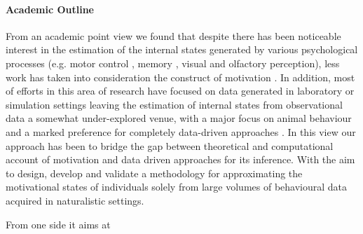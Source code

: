 \paragraph*{Academic Outline}
From an academic point view we found that despite there has been noticeable interest in the estimation of the internal states generated by various psychological processes (e.g. motor control \cite{gallego2017neural}, memory \cite{derdikman2011manifold, nieh2021geometry}, visual \cite{seung2000manifold, ganmor2015thesaurus} and olfactory \cite{stopfer2003intensity} perception), less work has taken into consideration the construct of motivation \cite{mcclure2003computational, zhang2009neural}. In addition, most of efforts in this area of research have focused on data generated in laboratory or simulation settings \cite{eyjolfsdottir2016learning, song2017reward, merel2019deep,calhoun2019unsupervised, seung2000manifold, pang2016dimensionality, luxem2020identifying, pereira2020quantifying, mccullough2021unsupervised, shi2021learning} leaving the estimation of internal states from observational data a somewhat under-explored venue, with a major focus on animal behaviour and a marked preference for completely data-driven approaches \cite{luxem2020identifying,pereira2020quantifying, mccullough2021unsupervised}. In this view our approach has been to bridge the gap between theoretical and computational account of motivation and data driven approaches for its inference. With the aim to design, develop and validate a methodology for approximating the motivational states of individuals solely from large volumes of behavioural data acquired in naturalistic settings. 


From one side it aims at 
